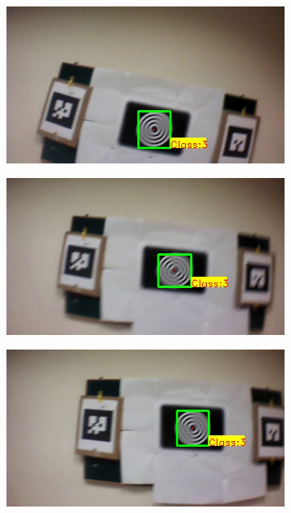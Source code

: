 \documentclass[10pt,twocolumn,letterpaper]{article}
\begin{document}
\begin{figure}
\begin{subfigure}[b]{.19\textwidth}
\end{subfigure}
\begin{subfigure}[b]{.19\textwidth}
\includegraphics[width=\linewidth]{BLUT_input_11/output3.jpg}
\end{subfigure}
\begin{subfigure}[b]{.19\textwidth}
\includegraphics[width=\linewidth]{BLUT_input_11/output4.jpg}
\end{subfigure}
\begin{subfigure}[b]{.19\textwidth}
\includegraphics[width=\linewidth]{BLUT_input_11/output5.jpg}

\end{subfigure}
\end{figure}
\end{document}
